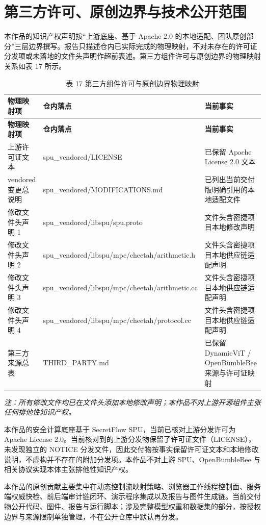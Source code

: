 \section{第三方许可、原创边界与技术公开范围}

本作品的知识产权声明按“上游底座、基于 Apache 2.0 的本地适配、团队原创部分”三层边界撰写。报告只描述仓内已实际完成的物理映射，不对未存在的许可证分发项或未落地的文件头声明作超前表述。第三方组件许可与原创边界的物理映射关系如表 17 所示。

\begin{longtable}{>{\raggedright\arraybackslash}p{}>{\raggedright\arraybackslash}p{}>{\raggedright\arraybackslash}p{}}
\caption{表 17 第三方组件许可与原创边界物理映射}\\
\toprule
\textbf{物理映射项} & \textbf{仓内落点} & \textbf{当前事实} \\
\midrule
\endfirsthead
\toprule
\textbf{物理映射项} & \textbf{仓内落点} & \textbf{当前事实} \\
\midrule
\endhead
上游许可证文本 & spu\_vendored/LICENSE & 已保留 Apache License 2.0 文本 \\
vendored 变更总说明 & spu\_vendored/MODIFICATIONS.md & 已列出当前交付版明确引用的本地适配文件 \\
修改文件头声明 1 & spu\_vendored/libspu/spu.proto & 文件头含密捷项目本地修改声明 \\
修改文件头声明 2 & spu\_vendored/libspu/mpc/cheetah/arithmetic.h & 文件头含密捷项目本地供应链适配声明 \\
修改文件头声明 3 & spu\_vendored/libspu/mpc/cheetah/arithmetic.cc & 文件头含密捷项目本地供应链适配声明 \\
修改文件头声明 4 & spu\_vendored/libspu/mpc/cheetah/protocol.cc & 文件头含密捷项目本地供应链适配声明 \\
第三方来源总表 & THIRD\_PARTY.md & 已保留 DynamicViT / OpenBumbleBee 来源与许可证映射 \\
\bottomrule
\end{longtable}

\noindent\textit{注：所有修改文件均已在文件头添加本地修改声明；本作品不对上游开源组件主张任何排他性知识产权。}

本作品的安全计算底座基于 SecretFlow SPU，当前已核对上游分发许可为 Apache License 2.0。当前核对到的上游分发物保留了许可证文件（LICENSE），未发现独立的 NOTICE 分发文件，因此交付物按事实保留许可证文本和本地修改说明，不虚构并不存在的附加分发项。本作品不对上游 SPU、OpenBumbleBee 与相关协议实现本体主张排他性知识产权。

本作品的原创贡献主要集中在动态控制流映射策略、浏览器工作线程控制面、服务端权威快检、前后端审计链闭环、演示程序集成以及报告与图件生成链。当前交付物公开代码、图件、报告与运行脚本；涉及完整模型权重和数据集的部分，按授权边界与来源限制单独管理，不在公开仓库中默认再分发。
